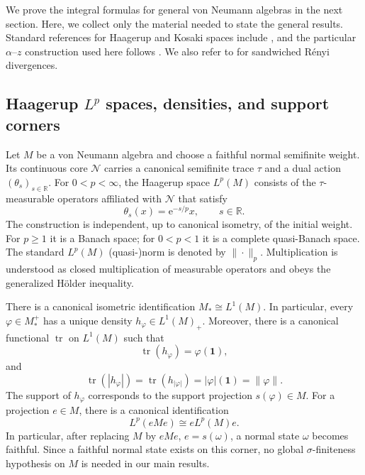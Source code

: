 \documentclass[12pt]{article}
\numberwithin{equation}{section}
\theoremstyle{definition}
\theoremstyle{remark}
\newcommand{\one}{\mathbf 1}
\newcommand{\?}{\overset{?}{=}}
\DeclareMathOperator{\tr}{tr}
\newcommand{\e}{\epsilon}
\newcommand{\cN}{\mathcal{N}}
\renewcommand{\e}{\mathrm e}
\begin{document}
We prove the integral formulas for general von Neumann algebras in the next section. Here, we collect only the material needed to state the general results.  Standard
references for Haagerup and Kosaki spaces include
\cite{Terp:1981lp,KOSAKI198429}, and the particular $\alpha$--$z$ construction used
here follows \cite{Kato:2023aro,Kato:2023hlj,Hiai:2024qve}. We also refer to \cite{Berta:2016vnw,Jencova:2016tqz,Jencova:2017txf} for sandwiched R\'enyi divergences.

\subsection{Haagerup \texorpdfstring{$L^p$}{Lp} spaces, densities, and support corners}

Let $M$ be a von Neumann algebra and choose a faithful normal semifinite
weight.  Its continuous core $\cN$ carries a canonical semifinite trace
$\tau$ and a dual action $(\theta_s)_{s\in\mathbb R}$.  For $0<p<\infty$,
the Haagerup space $L^p(M)$ consists of the $\tau$-measurable operators
affiliated with $\cN$ that satisfy
\begin{equation}
  \theta_s(x)=\e^{-s/p}x,
  \qquad s\in\mathbb R.
  \label{eq:haagerup-homogeneity}
\end{equation}
The construction is independent, up to canonical isometry, of the initial
weight.  For $p\geq1$ it is a Banach space; for $0<p<1$ it is a complete
quasi-Banach space. The standard $L^p(M)$ (quasi-)norm is denoted by
$\|\cdot\|_p$. Multiplication is understood as closed multiplication
of measurable operators and obeys the generalized H\"older inequality.

There is a canonical isometric identification
$M_*\cong L^1(M)$.  In particular, every
$\varphi\in M_*^+$ has a unique density
$h_\varphi\in L^1(M)_+$.
Moreover, there is a canonical functional $\tr$ on $L^1(M)$ such that
\begin{equation}
  \tr(h_\varphi)=\varphi(\one),
  \label{eq:density-normalization}
\end{equation}
and
\begin{equation}
    \tr(|h_{\varphi}|)=\tr(h_{|\varphi|})=|\varphi|(\one)=\|\varphi\|.
\end{equation}
The support of $h_\varphi$ corresponds to the support projection
$s(\varphi)\in M$.  For a projection $e\in M$, there is a canonical
identification
\begin{equation}
  L^p(eMe)\cong eL^p(M)e.
  \label{eq:corner-identification}
\end{equation}
In particular, after replacing $M$ by
$eMe$, $e=s(\omega)$, a normal state $\omega$ becomes faithful.  Since a
faithful normal state exists on this corner, no global
$\sigma$-finiteness hypothesis on $M$ is needed in our main results.
\end{document}
